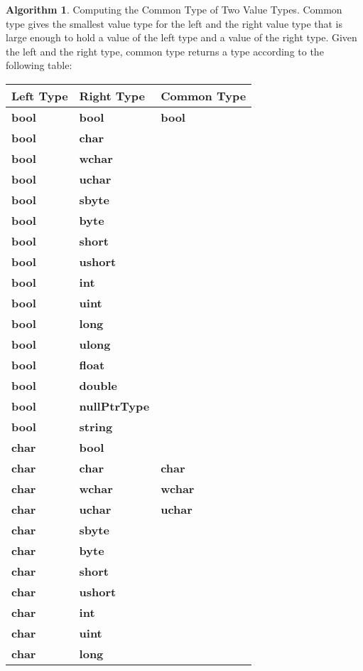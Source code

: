 \documentclass[a4paper,oneside,11pt]{book}
\theoremstyle{definition}
\newtheorem{algo}{Algorithm}[section]
\begin{document}
\begin{algo}\label{commontype} Computing the Common Type of Two Value Types.
Common type gives the smallest value type for the left and the right value type
that is large enough to hold a value of the left type and a value of the right type.
Given the left and the right type, common type returns a type according to the following table:
\begin{flushleft}
\begin{supertabular}{lll}
\textbf{Left Type}& \textbf{Right Type}& \textbf{Common Type}\\
\hline
\textbf{bool}& \textbf{bool}& \textbf{bool}\\
\textbf{bool}& \textbf{char}& \\
\textbf{bool}& \textbf{wchar}& \\
\textbf{bool}& \textbf{uchar}& \\
\textbf{bool}& \textbf{sbyte}& \\
\textbf{bool}& \textbf{byte}& \\
\textbf{bool}& \textbf{short}& \\
\textbf{bool}& \textbf{ushort}& \\
\textbf{bool}& \textbf{int}& \\
\textbf{bool}& \textbf{uint}& \\
\textbf{bool}& \textbf{long}& \\
\textbf{bool}& \textbf{ulong}& \\
\textbf{bool}& \textbf{float}& \\
\textbf{bool}& \textbf{double}& \\
\textbf{bool}& \textbf{nullPtrType}& \\
\textbf{bool}& \textbf{string}& \\
\hline
\textbf{char}& \textbf{bool}& \\
\textbf{char}& \textbf{char}& \textbf{char}\\
\textbf{char}& \textbf{wchar}& \textbf{wchar}\\
\textbf{char}& \textbf{uchar}& \textbf{uchar}\\
\textbf{char}& \textbf{sbyte}& \\
\textbf{char}& \textbf{byte}& \\
\textbf{char}& \textbf{short}& \\
\textbf{char}& \textbf{ushort}& \\
\textbf{char}& \textbf{int}& \\
\textbf{char}& \textbf{uint}& \\
\textbf{char}& \textbf{long}& \\

\end{supertabular}
\end{flushleft}
\end{algo}
\end{document}
